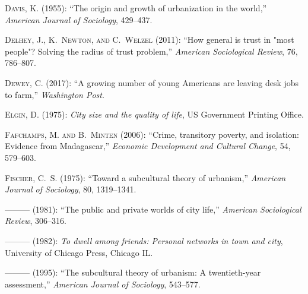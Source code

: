 \documentclass[11pt, letterpaper]{article}
\begin{document}
\begin{spacing}{1.4}
\begin{thebibliography}{92}
\textsc{Davis, K.} (1955): \enquote{The origin and growth of urbanization in
  the world,} \emph{American Journal of Sociology}, 429--437.

\textsc{Delhey, J., K.~Newton, and C.~Welzel} (2011): \enquote{How general is
  trust in "most people"? Solving the radius of trust problem,} \emph{American
  Sociological Review}, 76, 786--807.

\textsc{Dewey, C.} (2017): \enquote{A growing number of young Americans are
  leaving desk jobs to farm,} \emph{Washington Post}.

\textsc{Elgin, D.} (1975): \emph{City size and the quality of life}, US
  Government Printing Office.

\textsc{Fafchamps, M. and B.~Minten} (2006): \enquote{Crime, transitory
  poverty, and isolation: Evidence from Madagascar,} \emph{Economic Development
  and Cultural Change}, 54, 579--603.

\textsc{Fischer, C.~S.} (1975): \enquote{Toward a subcultural theory of
  urbanism,} \emph{American Journal of Sociology}, 80, 1319--1341.

---\hspace{-.1pt}---\hspace{-.1pt}--- (1981): \enquote{The public and private
  worlds of city life,} \emph{American Sociological Review}, 306--316.

---\hspace{-.1pt}---\hspace{-.1pt}--- (1982): \emph{To dwell among friends:
  Personal networks in town and city}, University of Chicago Press, Chicago IL.

---\hspace{-.1pt}---\hspace{-.1pt}--- (1995): \enquote{The subcultural theory
  of urbanism: A twentieth-year assessment,} \emph{American Journal of
  Sociology}, 543--577.


\end{thebibliography}
\end{spacing}
\end{document}
